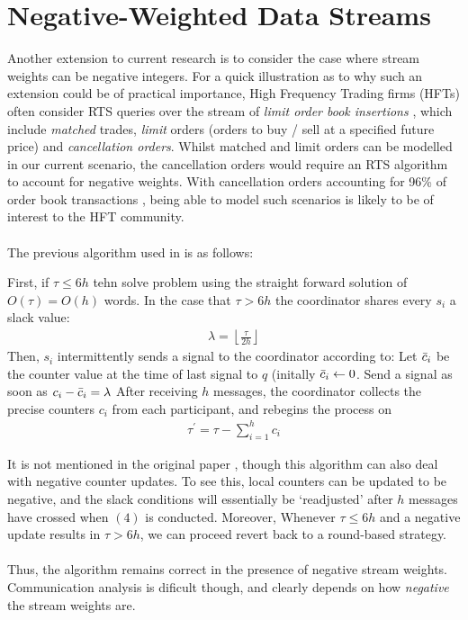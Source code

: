 \documentclass{article}
\begin{document}
\hspace{95mm}

\section*{Negative-Weighted Data Streams}


Another extension to current research is to consider the case where stream weights can be negative integers. For a quick illustration as to why such an extension could be of practical importance, High Frequency Trading firms (HFTs) often consider RTS queries over the stream of \textit{limit order book insertions} \cite{HFTData}, which include \textit{matched} trades, \textit{limit} orders (orders to buy / sell at a specified future price) and \textit{cancellation orders}. Whilst matched and limit orders can be modelled in our current scenario, the cancellation orders would require an RTS algorithm to account for negative weights. With cancellation orders accounting for 96\% of order book transactions \citep{HFTData}, being able to model such scenarios is likely to be of interest to the HFT community. \\
\\
The previous algorithm used in \cite{Gan2016} is as follows: 

   \begin{mdframed}
First, if $\tau\leq6h$ tehn solve problem using the straight forward solution of $O(\tau) = O(h)$ words. 
    In the case that $\tau > 6h$ the coordinator shares every $s_i$ a slack value: 
    \begin{align}
        \lambda = \left\lfloor \frac{\tau}{2h}\right\rfloor
    \end{align}
    Then, $s_i$ intermittently sends a signal to the coordinator according to: 
    Let $\Bar{c}_i$ be the counter value at the time of last signal to $q$ (initally $\Bar{c}_i\leftarrow0$. Send a signal as soon as $c_i - \Bar{c}_i = \lambda$
    After receiving $h$ messages, the coordinator collects the precise counters $c_i$ from each participant, and rebegins the process on 
    \begin{align}
        \tau^\prime = \tau - \sum_{i=1}^{h}c_i
    \end{align}
\end{mdframed}

It is not mentioned in the original paper \cite{Cormode2011}, though this algorithm can also deal with negative counter updates. To see this, local counters can be updated to be negative, and the slack conditions will essentially be `readjusted' after $h$ messages have crossed when $(4)$ is conducted.  Moreover, Whenever $\tau\leq6h$ and a negative update results in $\tau > 6h$, we can proceed revert back to a round-based strategy. \\
\\
Thus, the algorithm remains correct in the presence of negative stream weights. Communication analysis is dificult though, and clearly depends on how \textit{negative} the stream weights are.
\end{document}
